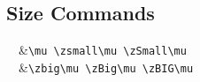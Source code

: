 \documentclass[a4paper]{article}
\begin{document}
\begin{multicols}{2}
\subsection{Size Commands}
\vspace*{-1ex}
\begin{symbols}
\mu~\zsmall\mu~\zSmall\mu &\verb'\mu \zsmall\mu \zSmall\mu'\\
\zbig\mu~\zBig\mu~\zBIG\mu &\verb'\zbig\mu \zBig\mu \zBIG\mu'\\
\end{symbols}
\end{multicols}
\end{document}
